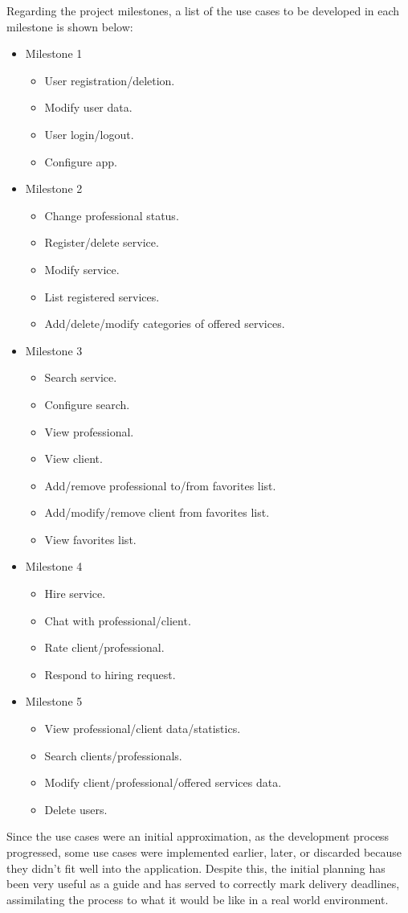 Regarding the project milestones, a list of the use cases to be developed in each milestone is shown below:
\begin{itemize}
	\item Milestone 1
	\begin{itemize}
		\item User registration/deletion.
		\item Modify user data.
		\item User login/logout.
		\item Configure app.
	\end{itemize}
	\item Milestone 2
	\begin{itemize}
		\item Change professional status.
		\item Register/delete service.
		\item Modify service.
		\item List registered services.
		\item Add/delete/modify categories of offered services.
	\end{itemize}
	\item Milestone 3
	\begin{itemize}
		\item Search service.
		\item Configure search.
		\item View professional.
		\item View client.
		\item Add/remove professional to/from favorites list.
		\item Add/modify/remove client from favorites list.
		\item View favorites list.
	\end{itemize}
	\item Milestone 4
	\begin{itemize}
		\item Hire service.
		\item Chat with professional/client.
		\item Rate client/professional.
		\item Respond to hiring request.
	\end{itemize}
	\item Milestone 5
	\begin{itemize}
		\item View professional/client data/statistics.
		\item Search clients/professionals.
		\item Modify client/professional/offered services data.
		\item Delete users.
	\end{itemize}
\end{itemize}
Since the use cases were an initial approximation, as the development process progressed, some use cases were implemented earlier, later, or discarded because they didn't fit well into the application. Despite this, the initial planning has been very useful as a guide and has served to correctly mark delivery deadlines, assimilating the process to what it would be like in a real world environment.




